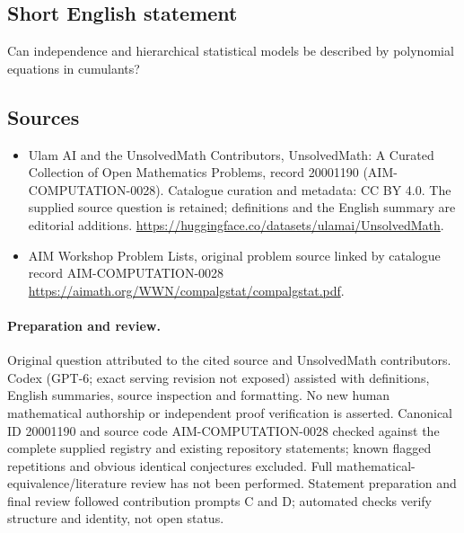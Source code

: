 \documentclass[11pt]{article}
\begin{document}
\subsection{Short English statement}
Can independence and hierarchical statistical models be described by polynomial equations in cumulants?
\subsection{Sources}
\begin{itemize}
\item[\hypertarget{source:20001190:1}{S1}] Ulam AI and the UnsolvedMath Contributors, UnsolvedMath: A Curated Collection of Open Mathematics Problems, record 20001190 (AIM-COMPUTATION-0028). Catalogue curation and metadata: CC BY 4.0. The supplied source question is retained; definitions and the English summary are editorial additions.
\url{https://huggingface.co/datasets/ulamai/UnsolvedMath}.
\item[\hypertarget{source:20001190:2}{S2}] AIM Workshop Problem Lists, original problem source linked by catalogue record AIM-COMPUTATION-0028
\url{https://aimath.org/WWN/compalgstat/compalgstat.pdf}.
\end{itemize}
\paragraph{Preparation and review.}
Original question attributed to the cited source and UnsolvedMath contributors. Codex (GPT-6; exact serving revision not exposed) assisted with definitions, English summaries, source inspection and formatting. No new human mathematical authorship or independent proof verification is asserted. Canonical ID 20001190 and source code AIM-COMPUTATION-0028 checked against the complete supplied registry and existing repository statements; known flagged repetitions and obvious identical conjectures excluded. Full mathematical-equivalence/literature review has not been performed. Statement preparation and final review followed contribution prompts C and D; automated checks verify structure and identity, not open status.
\label{end:20001190}
\end{document}
